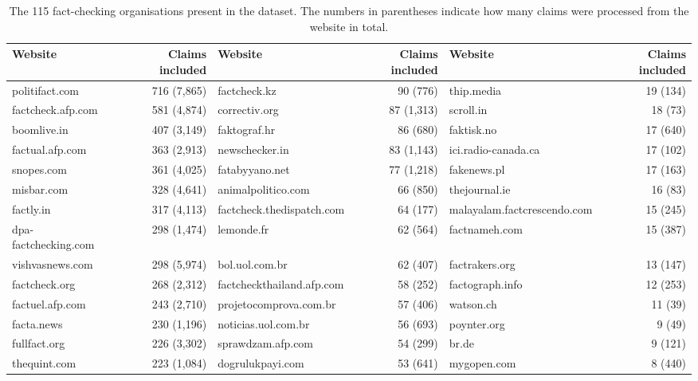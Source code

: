 \documentclass[sigconf,natbib=true,anonymous=false,nonacm]{acmart}
\begin{document}
\begin{table*}[h]
        \caption{The 115 fact-checking organisations present in the dataset.
        The numbers in parentheses indicate how many claims were processed from
        the website in total.}
    \begin{center}
        \footnotesize
        \begin{tabular}{lr | lr | lr}
            \toprule
            \textbf{Website} & \textbf{Claims included} &
            \textbf{Website} & \textbf{Claims included} &
            \textbf{Website} & \textbf{Claims included} \\

            \midrule

            politifact.com & 716 (7,865) & factcheck.kz & 90 (776) & thip.media & 19 (134) \\
            factcheck.afp.com & 581 (4,874) & correctiv.org & 87 (1,313) & scroll.in & 18 (73) \\
            boomlive.in & 407 (3,149) & faktograf.hr & 86 (680) & faktisk.no & 17 (640) \\
            factual.afp.com & 363 (2,913) & newschecker.in & 83 (1,143) & ici.radio-canada.ca & 17 (102) \\
            snopes.com & 361 (4,025) & fatabyyano.net & 77 (1,218) & fakenews.pl & 17 (163) \\
            misbar.com & 328 (4,641) & animalpolitico.com & 66 (850) & thejournal.ie & 16 (83) \\
            factly.in & 317 (4,113) & factcheck.thedispatch.com & 64 (177) & malayalam.factcrescendo.com & 15 (245) \\
            dpa-factchecking.com & 298 (1,474) & lemonde.fr & 62 (564) & factnameh.com & 15 (387) \\
            vishvasnews.com & 298 (5,974) & bol.uol.com.br & 62 (407) & factrakers.org & 13 (147) \\
            factcheck.org & 268 (2,312) & factcheckthailand.afp.com & 58 (252) & factograph.info & 12 (253) \\
            factuel.afp.com & 243 (2,710) & projetocomprova.com.br & 57 (406) & watson.ch & 11 (39) \\
            facta.news & 230 (1,196) & noticias.uol.com.br & 56 (693) & poynter.org & 9 (49) \\
            fullfact.org & 226 (3,302) & sprawdzam.afp.com & 54 (299) & br.de & 9 (121) \\
            thequint.com & 223 (1,084) & dogrulukpayi.com & 53 (641) & mygopen.com & 8 (440) \\

\end{tabular}
\end{center}
\end{table*}
\end{document}
